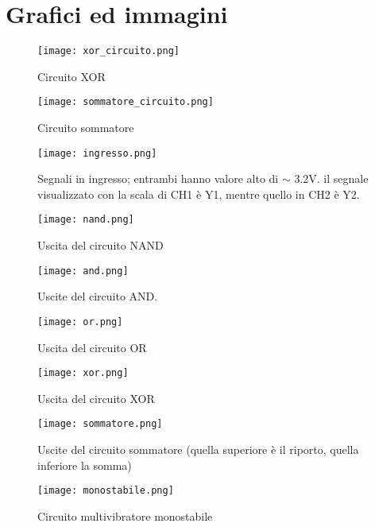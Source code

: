 \section{Grafici ed immagini}

\begin{figure}[h]
	\centering
	\texttt{[image: xor\_circuito.png]}
	\caption{Circuito XOR}
	\label{f:xor_circuito}
\end{figure}

\begin{figure}[h]
	\centering
	\texttt{[image: sommatore\_circuito.png]}
	\caption{Circuito sommatore}
	\label{f:sommatore_circuito}
\end{figure}

\begin{figure}[h]
	\centering
	\texttt{[image: ingresso.png]}
	\caption{Segnali in ingresso; entrambi hanno valore alto di $\sim$ 3.2V.  il segnale visualizzato con la scala di CH1 è Y1, mentre quello in CH2 è Y2.}
	\label{f:ingressi}
\end{figure}

\begin{figure}[h]
	\centering
	\texttt{[image: nand.png]}
	\caption{Uscita del circuito NAND }
	\label{f:NAND}
\end{figure}

\begin{figure}[h]
	\centering
	\texttt{[image: and.png]}
	\caption{Uscite del circuito AND.}
	\label{f:AND}
\end{figure}

\begin{figure}[h]
	\centering
	\texttt{[image: or.png]}
	\caption{Uscita del circuito OR}
	\label{f:OR}
\end{figure}

\begin{figure}[h]
	\centering
	\texttt{[image: xor.png]}
	\caption{Uscita del circuito XOR}
	\label{f:XOR}
\end{figure}

\begin{figure}[h]
	\centering
	\texttt{[image: sommatore.png]}
	\caption{Uscite del circuito sommatore (quella superiore è il riporto, quella inferiore la somma)}
	\label{f:Sommatore}
\end{figure}


\begin{figure}[h]
	\centering
	\texttt{[image: monostabile.png]}
	\caption{Circuito multivibratore monostabile}
	\label{f:monostabile}
\end{figure}

